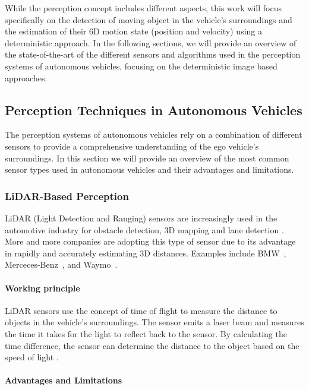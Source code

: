 While the perception concept includes different aspects, this work will focus specifically on the detection of 
moving object in the vehicle's surroundings and the estimation of their 6D motion state (position and velocity) 
using a deterministic approach. In the following sections, we will provide an overview of the state-of-the-art of
the different sensors and algorithms used in the perception systems of autonomous vehicles, focusing on the deterministic image
based approaches.

\subsection{Perception Techniques in Autonomous Vehicles}

The perception systems of autonomous vehicles rely on a combination of different sensors to provide a 
comprehensive understanding of the ego vehicle's surroundings. In this section we will provide an overview of
the most common sensor types used in autonomous vehicles and their advantages and limitations.


\subsubsection{LiDAR-Based Perception}

LiDAR (Light Detection and Ranging) sensors are increasingly used in the automotive industry for 
obstacle detection, 3D mapping and lane detection \cite{autonomous_vehicles_perception_survey}. More and more companies are adopting this type of sensor due to its advantage 
in rapidly and accurately estimating 3D distances. Examples include BMW~\cite{lidarbased_bmw}, 
Merceces-Benz~\cite{lidarbased_mercedes}, and Waymo~\cite{lidarbased_waymo}.

\paragraph{Working principle}

LiDAR sensors use the concept of time of flight to measure the distance to objects in the vehicle's surroundings.
The sensor emits a laser beam and measures the time it takes for the light to reflect back to the sensor.
By calculating the time difference, the sensor can determine the distance to the object based 
on the speed of light \cite{lidarbased_review}.

\paragraph{Advantages and Limitations}

